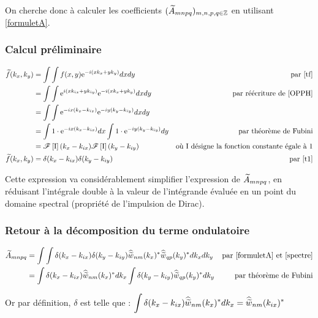 On cherche donc à calculer les coefficients $(\widetilde{A}_{mnpq})_{m,n,p,q\in\mathbb{Z}}$ en utilisant \eqref{formuletA}.


\subsubsection{Calcul préliminaire}


\begin{align}
  \widetilde{f}(k_x,k_y)  &= \displaystyle\int\displaystyle\int f(x,y)\mathrm{e}^{-i(xk_x+yk_y)}dxdy &
  \text{par \eqref{tf}}\nonumber\\
      &= \displaystyle\int\displaystyle\int\mathrm{e}^{i(xk_{ix}+yk_{iy})}\mathrm{e}^{-i(xk_x+yk_y)}dxdy &
      \text{par réécriture de \eqref{OPPH}}\nonumber\\
      &= \displaystyle\int\displaystyle\int\mathrm{e}^{-ix(k_x-k_{ix})}\mathrm{e}^{-iy(k_y-k_{iy})}dxdy & 
      \text{ }\nonumber\\
      &= \displaystyle\int 1\cdot\mathrm{e}^{-ix(k_x-k_{ix})}dx\displaystyle\int 1\cdot\mathrm{e}^{-iy(k_y-k_{iy})}dy &
      \text{par théorème de Fubini}\nonumber\\
      &= \mathscr{F}\left[ \mathrm{I}\right](k_x-k_{ix})\mathscr{F}\left[ \mathrm{I}\right](k_y-k_{iy}) &
      \text{où $\mathrm{I}$ désigne la fonction constante égale à $1$}\nonumber\\
  \widetilde{f}(k_x,k_y)  &= \delta (k_x-k_{ix})\delta (k_y-k_{iy}) &
  \text{par  \eqref{t1}}\label{spectre}
\end{align}

Cette expression va considérablement simplifier l'expression de $\widetilde{A}_{mnpq}$, en réduisant l'intégrale double
à la valeur de l'intégrande évaluée en un point du domaine spectral (propriété de l'impulsion de Dirac).


\subsubsection{Retour à la décomposition du terme ondulatoire}


\begin{align*}
  \widetilde{A}_{mnpq} &= \displaystyle\int\displaystyle\int\delta (k_x-k_{ix})\delta (k_y-k_{iy})
  \widehat{\widetilde{w}}_{nm}(k_x)^\ast\widehat{\widetilde{w}}_{qp}(k_y)^\ast dk_xdk_y &
  \text{par \eqref{formuletA} et \eqref{spectre}}\\
   &= \displaystyle\int\delta (k_x-k_{ix})\widehat{\widetilde{w}}_{nm}(k_x)^\ast dk_x
  \displaystyle\int\delta (k_y-k_{iy})\widehat{\widetilde{w}}_{qp}(k_y)^\ast dk_y &
  \text{par théorème de Fubini}
\end{align*}

Or par définition, $\delta$ est telle que : $\displaystyle\int\delta (k_x-k_{ix})\widehat{\widetilde{w}}_{nm}(k_x)^\ast dk_x =
\widehat{\widetilde{w}}_{nm}(k_{ix})^\ast $

